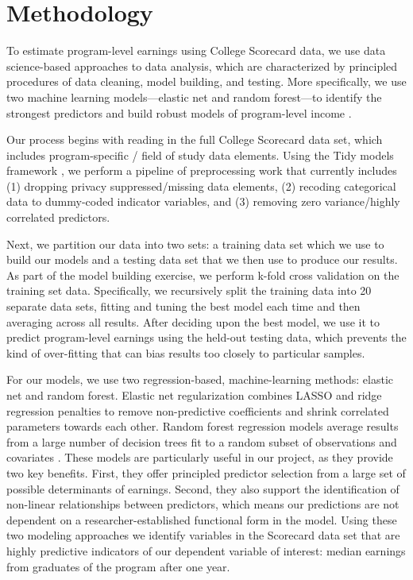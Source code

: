 \documentclass[a4paper, 12pt]{article}
\begin{document}
\section*{Methodology}

To estimate program-level earnings using College Scorecard data, we use data science-based approaches to data analysis, which are characterized by principled procedures of data cleaning, model building, and testing. More specifically, we use two machine learning models---elastic net and random forest---to identify the strongest predictors and build robust models of program-level income \parencite{Hastie_etal_2016, Kuhn_Silge_2022}.

Our process begins with reading in the full College Scorecard data set, which includes program-specific / field of study data elements. Using the Tidy models framework \parencite{Kuhn_Silge_2022}, we perform a pipeline of preprocessing work that currently includes (1) dropping privacy suppressed/missing data elements, (2) recoding categorical data to dummy-coded indicator variables, and (3) removing zero variance/highly correlated predictors.

Next, we partition our data into two sets: a training data set which we use to build our models and a testing data set that we then use to produce our results. As part of the model building exercise, we perform k-fold cross validation on the training set data. Specifically, we recursively split the training data into 20 separate data sets, fitting and tuning the best model each time and then averaging across all results. After deciding upon the best model, we use it to predict program-level earnings using the held-out testing data, which prevents the kind of over-fitting that can bias results too closely to particular samples.

For our models, we use two regression-based, machine-learning methods: elastic net and random forest. Elastic net regularization combines LASSO and ridge regression penalties to remove non-predictive coefficients and shrink correlated parameters towards each other. Random forest regression models average results from a large number of decision trees fit to a random subset of observations and covariates \parencite{Hastie_etal_2016}. These models are particularly useful in our project, as they provide two key benefits. First, they offer principled predictor selection from a large set of possible determinants of earnings. Second, they also support the identification of non-linear relationships between predictors, which means our predictions are not dependent on a researcher-established functional form in the model. Using these two modeling approaches we identify variables in the Scorecard data set that are highly predictive indicators of our dependent variable of interest: median earnings from graduates of the program after one year.
\end{document}

